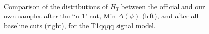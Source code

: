 \begin{figure}
        \centering
        \hspace{-1 cm}
        ~ %
        \caption{Comparison of the distributions of $H_T$ between the official and our own samples after the ``n-1" cut, Min $\Delta(\phi)$ (left), and after all baseline cuts (right), for the T1qqqq signal model.}\label{fig:animals}
\end{figure}        
        
